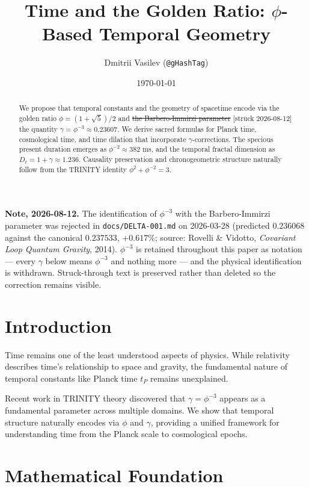 \documentclass[12pt,a4paper]{article}
\title{Time and the Golden Ratio: $\phi$-Based Temporal Geometry}
\author{Dmitrii Vasilev (\texttt{@gHashTag})}
\date{\today}
\begin{document}
\maketitle

\begin{abstract}
We propose that temporal constants and the geometry of spacetime encode via the golden ratio $\phi = (1+\sqrt{5})/2$ and \sout{the Barbero-Immirzi parameter} [struck 2026-08-12] the quantity $\gamma = \phi^{-3} \approx 0.23607$. We derive sacred formulas for Planck time, cosmological time, and time dilation that incorporate $\gamma$-corrections. The specious present duration emerges as $\phi^{-2} \approx 382$ ms, and the temporal fractal dimension as $D_t = 1 + \gamma \approx 1.236$. Causality preservation and chronogeometric structure naturally follow from the TRINITY identity $\phi^2 + \phi^{-2} = 3$.
\end{abstract}

\bigskip
\noindent\textbf{Note, 2026-08-12.} The identification of $\phi^{-3}$ with the Barbero-Immirzi parameter was rejected in \texttt{docs/DELTA-001.md} on 2026-03-28 (predicted $0.236068$ against the canonical $0.237533$, $+0.617\%$; source: Rovelli \& Vidotto, \emph{Covariant Loop Quantum Gravity}, 2014). $\phi^{-3}$ is retained throughout this paper as notation --- every $\gamma$ below means $\phi^{-3}$ and nothing more --- and the physical identification is withdrawn. Struck-through text is preserved rather than deleted so the correction remains visible.

\section{Introduction}

Time remains one of the least understood aspects of physics. While relativity describes time's relationship to space and gravity, the fundamental nature of temporal constants like Planck time $t_P$ remains unexplained.

Recent work in TRINITY theory discovered that $\gamma = \phi^{-3}$ appears as a fundamental parameter across multiple domains. We show that temporal structure naturally encodes via $\phi$ and $\gamma$, providing a unified framework for understanding time from the Planck scale to cosmological epochs.

\section{Mathematical Foundation}
\end{document}
